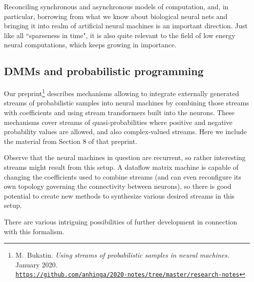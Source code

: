 \documentclass{article}
\begin{document}
Reconciling synchronous and asynchronous models of computation, and, in particular, borrowing from
what we know about biological neural nets and bringing it into realm of artificial neural machines is
an important direction. Just like all ``sparseness in time", it is also quite relevant to the field of low energy
neural computations, which keeps growing in importance.

\subsection{DMMs and probabilistic programming}

Our preprint\footnote{M.~Bukatin. {\em Using streams of probabilistic samples in neural machines.} January 2020.\\
\href{https://github.com/anhinga/2020-notes/tree/master/research-notes}{\tt https://github.com/anhinga/2020-notes/tree/master/research-notes}} describes mechanisms allowing to integrate externally generated streams of
probabilistic samples into neural machines by
combining those streams with coefficients and using stream transformers built into the neurons.
These mechanisms cover streams of quasi-probabilities where positive and negative probability values are allowed,
and also complex-valued streams. Here we include the material from Section 8 of that preprint.


Observe that the neural machines in question are recurrent, so rather interesting streams might result from this setup.
A dataflow matrix machine is capable of changing the coefficients used to combine streams (and can even reconfigure its own topology governing the connectivity between neurons),
so there is good potential to create new methods to synthesize various desired streams in this setup.

There are various intriguing possibilities of further development in connection with this formalism.
\end{document}
